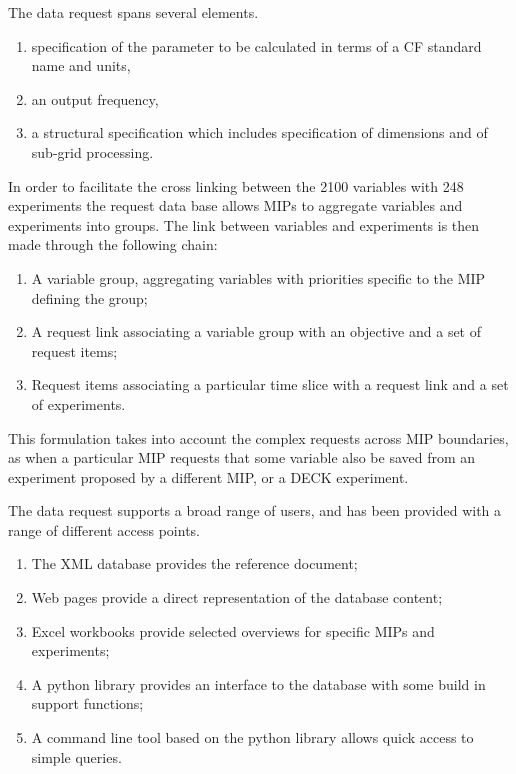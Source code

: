 \documentclass[gmd,manuscript]{copernicus}
\begin{document}
The data request spans several elements.

\begin{enumerate}
\item specification of the parameter to be calculated in terms of a CF
  standard name and units,
\item an output frequency,
\item a structural specification which includes specification of
  dimensions and of sub-grid processing.
\end{enumerate}

In order to facilitate the cross linking between the 2100 variables
with 248 experiments the request data base allows MIPs to aggregate
variables and experiments into groups. The link between variables and
experiments is then made through the following chain:

\begin{enumerate}
\item A variable group, aggregating variables with priorities specific
  to the MIP defining the group;
\item A request link associating a variable group with an objective and
  a set of request items;
\item Request items associating a particular time slice with a
  request link and a set of experiments.
\end{enumerate}

This formulation takes into account the complex requests across MIP
boundaries, as when a particular MIP requests that some variable also
be saved from an experiment proposed by a different MIP, or a DECK
experiment.

The data request supports a broad range of users, and has been
provided with a range of different access points.

\begin{enumerate}
\item The XML database provides the reference document;
\item Web pages provide a direct representation of the database
  content;
\item Excel workbooks provide selected overviews for specific MIPs and
  experiments;
\item A python library provides an interface to the database with some
  build in support functions;
\item A command line tool based on the python library allows quick
  access to simple queries.
\end{enumerate}
\end{document}
